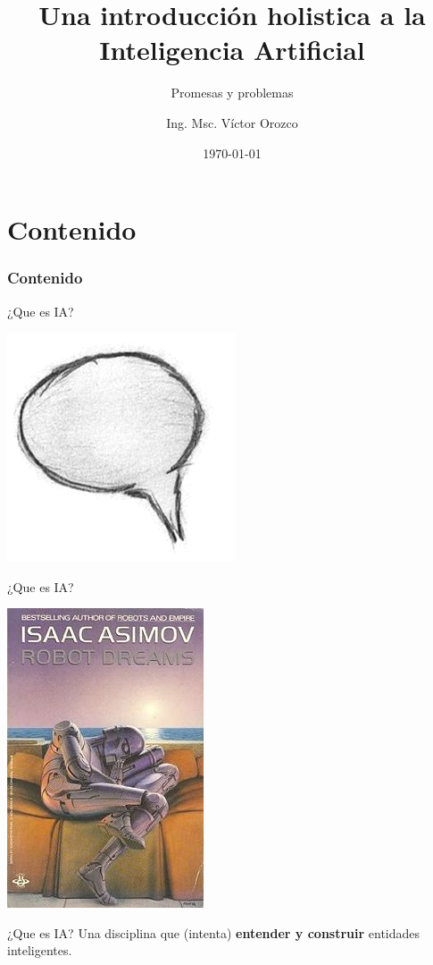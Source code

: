 \documentclass[aspectratio=169]{beamer}
\title{Una introducción holistica a la Inteligencia Artificial}
\subtitle{Promesas y problemas}
\author{Ing. Msc. Víctor Orozco}
\institute{Nabenik}
\date{\today}
\begin{document}
\maketitle

\section{Contenido}
\begin{frame}
	\frametitle{Contenido}
	\tableofcontents
\end{frame}

\begin{frame}{¿Que es IA?}
\begin{center}
\includegraphics[width=0.4\linewidth]{Images/comment}
\end{center}
\end{frame}


\begin{frame}{¿Que es IA?}
\begin{center}
\includegraphics[width=0.4\linewidth]{Images/RobotDreams}
\end{center}
\end{frame}


\begin{frame}{¿Que es IA?}
Una disciplina que (intenta) \textbf{entender y construir} entidades 
inteligentes.
\end{frame}
\end{document}
